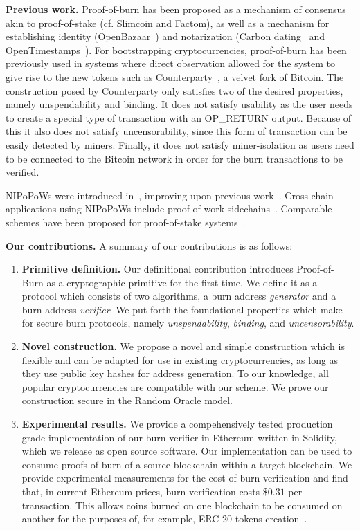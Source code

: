 \noindent
\textbf{Previous work.}
Proof-of-burn has been proposed as a mechanism of consensus akin to
proof-of-stake (cf. Slimcoin and Factom), as well as a mechanism for
establishing identity (OpenBazaar~\cite{zindros2016trust}) and notarization
(Carbon dating~\cite{clark2012commitcoin} and
OpenTimestamps~\cite{todd2016opentimestamps}). For bootstrapping
cryptocurrencies, proof-of-burn has been previously used in systems where direct
observation allowed for the system to give rise to the new tokens such as
Counterparty~\cite{counterparty}, a velvet fork of Bitcoin. The construction posed by Counterparty only satisfies two of the desired properties, namely unspendability and binding. It does not satisfy usability as the user needs to create a special type of transaction with an \textsf{OP\_RETURN} output. Because of this it also does not satisfy uncensorability, since this form of transaction can be easily detected by miners. Finally, it does not satisfy miner-isolation as users need to be connected to the Bitcoin network in order for the burn transactions to be verified.

NIPoPoWs were introduced in~\cite{nipopows}, improving upon previous
work~\cite{popow,highway}. Cross-chain applications using NIPoPoWs include
proof-of-work sidechains~\cite{pow-sidechains}. Comparable schemes have been
proposed for proof-of-stake systems~\cite{pos-sidechains}.

\noindent
\textbf{Our contributions.}
A summary of our contributions is as follows:
\begin{enumerate}[wide, labelwidth=!, labelindent=0pt, label=(\roman*)]
    \item \textbf{Primitive definition.} Our definitional contribution introduces Proof-of-Burn as a cryptographic primitive for the first time. We
    define it as a protocol which consists of two algorithms, a burn address \emph{generator} and a burn address \emph{verifier}. We put forth the foundational properties which make for secure burn protocols, namely \emph{unspendability}, \emph{binding}, and \emph{uncensorability}.
    \item \textbf{Novel construction.} We propose a novel and simple construction which is flexible and can be adapted for use in existing cryptocurrencies, as long as they use public key hashes for address generation. To our knowledge, all popular cryptocurrencies are
    compatible with our scheme. We prove our construction secure in the Random Oracle model.
    \item \textbf{Experimental results.} We provide a compehensively tested production grade implementation of our burn verifier in Ethereum
    written in Solidity, which we release as open source software. Our implementation can be used to consume proofs of burn of a source blockchain
    within a target blockchain. We provide experimental measurements for the cost of burn verification and find that, in current Ethereum prices,
    burn verification costs $\$0.31$ per transaction.
    This allows coins burned on one blockchain to be consumed on another for the purposes of, for example, ERC-20 tokens creation~\cite{erc20}.
\end{enumerate}

